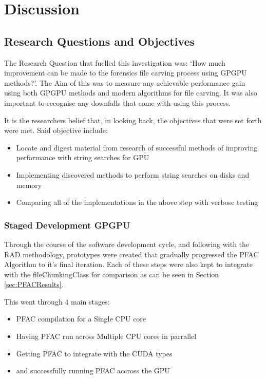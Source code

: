 


\chapter{Discussion}
\label{chap:chapter5}

\section{Research Questions and Objectives}
The Research Question that fuelled this investigation was: `How much improvement can be made to the forensics file carving process using \ac{GPGPU} methods?'.
The Aim of this was to measure any achievable performance gain using both \ac{GPGPU} methods and modern algorithms for file carving.
It was also important to recognise any downfalls that come with using this process.

It is the researchers belief that, in looking back, the objectives that were set forth were met.
Said objective include:
\begin{itemize}[noitemsep, topsep=0pt]
    \item Locate and digest material from research of successful methods of improving performance with string searches for \ac{GPU}
    \item Implementing discovered methods to perform string searches on disks and memory
    \item Comparing all of the implementations in the above step with verbose testing
\end{itemize}

\subsection{Staged Development \ac{GPGPU}}
Through the course of the software development cycle, and following with the \ac{RAD} methodology, prototypes were created that gradually progressed the PFAC Algorithm to it's final iteration.
Each of these steps were also kept to integrate with the fileChunkingClass for comparison as can be seen in Section \ref{sec:PFACResults}.

This went through 4 main stages:
\begin{itemize}[noitemsep, topsep=0pt]
    \item PFAC compilation for a Single CPU core
    \item Having PFAC run across Multiple CPU cores in parrallel
    \item Getting PFAC to integrate with the CUDA types
    \item and successfully running PFAC accross the GPU
\end{itemize}

